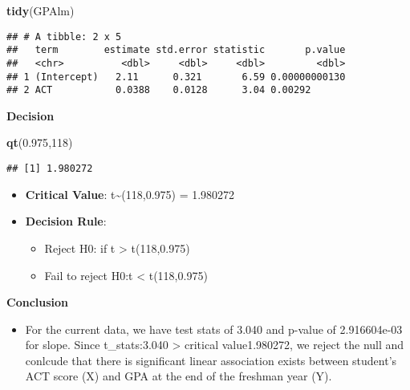\documentclass[]{article}
\newenvironment{Shaded}{\begin{snugshade}}{\end{snugshade}}
\newcommand{\DecValTok}[1]{\textcolor[rgb]{0.00,0.00,0.81}{#1}}
\newcommand{\FloatTok}[1]{\textcolor[rgb]{0.00,0.00,0.81}{#1}}
\newcommand{\KeywordTok}[1]{\textcolor[rgb]{0.13,0.29,0.53}{\textbf{#1}}}
\newcommand{\NormalTok}[1]{#1}
\providecommand{\tightlist}{%
  \setlength{\itemsep}{0pt}\setlength{\parskip}{0pt}}
\begin{document}
\begin{Shaded}
\begin{Highlighting}[]
\KeywordTok{tidy}\NormalTok{(GPAlm)}
\end{Highlighting}
\end{Shaded}

\begin{verbatim}
## # A tibble: 2 x 5
##   term        estimate std.error statistic       p.value
##   <chr>          <dbl>     <dbl>     <dbl>         <dbl>
## 1 (Intercept)   2.11      0.321       6.59 0.00000000130
## 2 ACT           0.0388    0.0128      3.04 0.00292
\end{verbatim}

\textbf{Decision}

\begin{Shaded}
\begin{Highlighting}[]
\KeywordTok{qt}\NormalTok{(}\FloatTok{0.975}\NormalTok{,}\DecValTok{118}\NormalTok{)}
\end{Highlighting}
\end{Shaded}

\begin{verbatim}
## [1] 1.980272
\end{verbatim}

\begin{itemize}
\tightlist
\item
  \textbf{Critical Value}: t\textasciitilde{}(118,0.975) = 1.980272
\item
  \textbf{Decision Rule}:

  \begin{itemize}
  \tightlist
  \item
    Reject H0: if \textbar{}t\textbar{} \textgreater{} t(118,0.975)
  \item
    Fail to reject H0:\textbar{}t\textbar{} \textless{} t(118,0.975)
  \end{itemize}
\end{itemize}

\textbf{Conclusion}

\begin{itemize}
\tightlist
\item
  For the current data, we have test stats of 3.040 and p-value of
  2.916604e-03 for slope. Since t\_stats:3.040 \textgreater{} critical
  value1.980272, we reject the null and conlcude that there is
  significant linear association exists between student's ACT score (X)
  and GPA at the end of the freshman year (Y).
\end{itemize}
\end{document}
